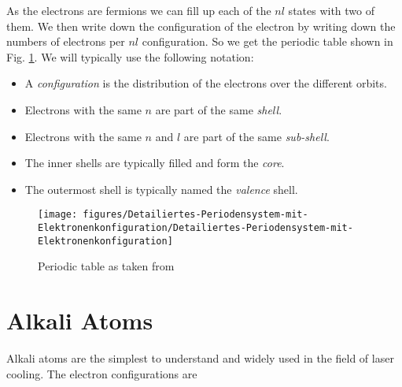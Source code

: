 \documentclass[10pt]{article}
\let\cite\citep
\providecommand\citep{\cite}
\begin{document}
As the electrons are fermions we can fill up each of the $nl$ states with two of them. We then write down the configuration of the electron by writing down the numbers of electrons per $nl$ configuration. So we get the periodic table shown in Fig. \ref{783282}. We will typically use the following notation:
\begin{itemize}
\item A \textit{configuration} is the distribution of the electrons over the different orbits.
\item Electrons with the same $n$ are part of the same \textit{shell}.
\item Electrons with the same $n$ and $l$ are part of the same \textit{sub-shell}.
\item The inner shells are typically filled and form the \textit{core}. 
\item The outermost shell is typically named the \textit{valence} shell.
\end{itemize}
\begin{figure}[h!]
\begin{center}
\texttt{[image: figures/Detailiertes-Periodensystem-mit-Elektronenkonfiguration/Detailiertes-Periodensystem-mit-Elektronenkonfiguration]}
\caption{{Periodic table as taken from \protect\cite{commons}
{\label{783282}}%
}}
\end{center}
\end{figure}

\section{Alkali Atoms}

Alkali atoms are the simplest to understand and widely used in the field of laser cooling. The electron configurations are
\end{document}
